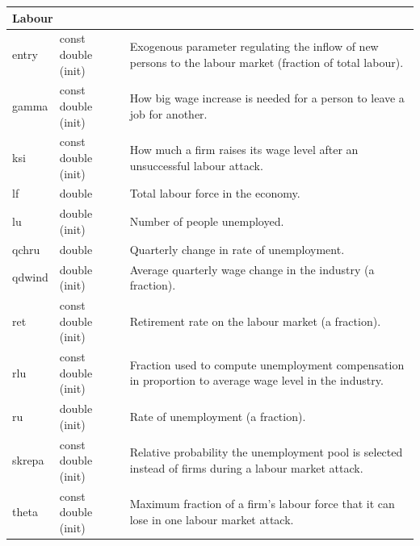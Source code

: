 \documentclass{article}
\begin{document}
\begin{longtable}{p{}p{}p{}}
\multicolumn{3}{l}{\textbf{Labour}} \\
\midrule
entry & const double (init) & Exogenous parameter regulating the inflow of new persons to the labour market (fraction of total labour).\\
gamma & const double (init) & How big wage increase is needed for a person to leave a job for another.\\
ksi & const double (init) & How much a firm raises its wage level after an unsuccessful labour attack.\\
lf & double & Total labour force in the economy.\\
lu & double (init) & Number of people unemployed.\\
qchru & double & Quarterly change in rate of unemployment.\\
qdwind & double (init) & Average quarterly wage change in the industry (a fraction).\\
ret & const double (init) & Retirement rate on the labour market (a fraction).\\
rlu & const double (init) & Fraction used to compute unemployment compensation in proportion to average wage level in the industry.\\
ru & double (init) & Rate of unemployment (a fraction).\\
skrepa & const double (init) & Relative probability the unemployment pool is selected instead of firms during a labour market attack.\\
theta & const double (init) & Maximum fraction of a firm's labour force that it can lose in one labour market attack.\\
\midrule


\end{longtable}
\end{document}
